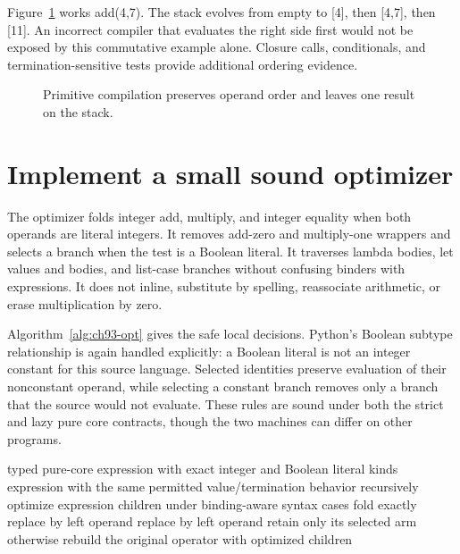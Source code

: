 Figure~\ref{fig:ch93-stack} works add(4,7).
The stack evolves from empty to [4], then [4,7], then [11].
An incorrect compiler that evaluates the right side first would not be exposed by this commutative example alone.
Closure calls, conditionals, and termination-sensitive tests provide additional ordering evidence.

\begin{figure}[htbp]
\centering
{}
\caption{Primitive compilation preserves operand order and leaves one result on the stack.}
\label{fig:ch93-stack}
\end{figure}

\section{Implement a small sound optimizer}
\label{sec:ch93-opt}
The optimizer folds integer add, multiply, and integer equality when both operands are literal integers.
It removes add-zero and multiply-one wrappers and selects a branch when the test is a Boolean literal.
It traverses lambda bodies, let values and bodies, and list-case branches without confusing binders with expressions.
It does not inline, substitute by spelling, reassociate arithmetic, or erase multiplication by zero.

Algorithm~\ref{alg:ch93-opt} gives the safe local decisions.
Python's Boolean subtype relationship is again handled explicitly: a Boolean literal is not an integer constant for this source language.
Selected identities preserve evaluation of their nonconstant operand, while selecting a constant branch removes only a branch that the source would not evaluate.
These rules are sound under both the strict and lazy pure core contracts, though the two machines can differ on other programs.

\begin{algorithm}[htbp]
\caption{Apply local pure-core rewrites without erasing demanded divergent computation.}
\label{alg:ch93-opt}
\begin{pseudocode}
\Require typed pure-core expression with exact integer and Boolean literal kinds
\Ensure expression with the same permitted value/termination behavior
\State recursively optimize expression children under binding-aware syntax cases
 \State fold exactly \EndIf
{} \State replace by left operand \EndIf
{} \State replace by left operand \EndIf
{} \State retain only its selected arm \EndIf
\State otherwise rebuild the original operator with optimized children
\end{pseudocode}
\end{algorithm}

